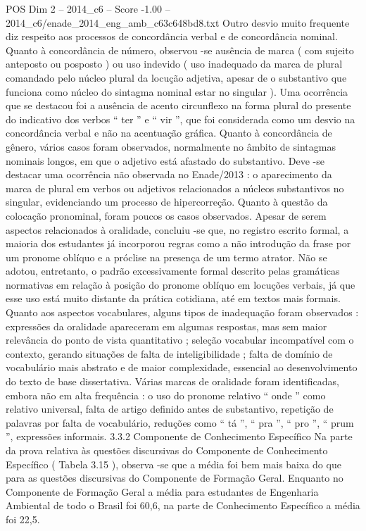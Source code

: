 \begin{textsample}{POS Dim 2 – 2014\_c6 – Score -1.00 – 2014\_c6/enade\_2014\_eng\_amb\_c63c648bd8.txt}
Outro desvio muito frequente diz respeito aos processos de concordância verbal e de concordância nominal.
Quanto à concordância de número, observou -se ausência de marca ( com sujeito anteposto ou posposto ) ou uso indevido ( uso inadequado da marca de plural comandado pelo núcleo plural da locução adjetiva, apesar de o substantivo que funciona como núcleo do sintagma nominal estar no singular ).
Uma ocorrência que se destacou foi a ausência de acento circunflexo na forma plural do presente do indicativo dos verbos “ ter ” e “ vir ”, que foi considerada como um desvio na concordância verbal e não na acentuação gráfica.
Quanto à concordância de gênero, vários casos foram observados, normalmente no âmbito de sintagmas nominais longos, em que o adjetivo está afastado do substantivo.
Deve -se destacar uma ocorrência não observada no Enade/2013 : o aparecimento da marca de plural em verbos ou adjetivos relacionados a núcleos substantivos no singular, evidenciando um processo de hipercorreção.
Quanto à questão da colocação pronominal, foram poucos os casos observados.
Apesar de serem aspectos relacionados à oralidade, concluiu -se que, no registro escrito formal, a maioria dos estudantes já incorporou regras como a não introdução da frase por um pronome oblíquo e a próclise na presença de um termo atrator.
Não se adotou, entretanto, o padrão excessivamente formal descrito pelas gramáticas normativas em relação à posição do pronome oblíquo em locuções verbais, já que esse uso está muito distante da prática cotidiana, até em textos mais formais.
Quanto aos aspectos vocabulares, alguns tipos de inadequação foram observados : expressões da oralidade apareceram em algumas respostas, mas sem maior relevância do ponto de vista quantitativo ; seleção vocabular incompatível com o contexto, gerando situações de falta de inteligibilidade ; falta de domínio de vocabulário mais abstrato e de maior complexidade, essencial ao desenvolvimento do texto de base dissertativa.
Várias marcas de oralidade foram identificadas, embora não em alta frequência : o uso do pronome relativo “ onde ” como relativo universal, falta de artigo definido antes de substantivo, repetição de palavras por falta de vocabulário, reduções como “ tá ”, “ pra ”, “ pro ”, “ prum ”, expressões informais. 3.3.2 Componente de Conhecimento Específico Na parte da prova relativa às questões discursivas do Componente de Conhecimento Específico ( Tabela 3.15 ), observa -se que a média foi bem mais baixa do que para as questões discursivas do Componente de Formação Geral.
Enquanto no Componente de Formação Geral a média para estudantes de Engenharia Ambiental de todo o Brasil foi 60,6, na parte de Conhecimento Específico a média foi 22,5.

\end{textsample}
